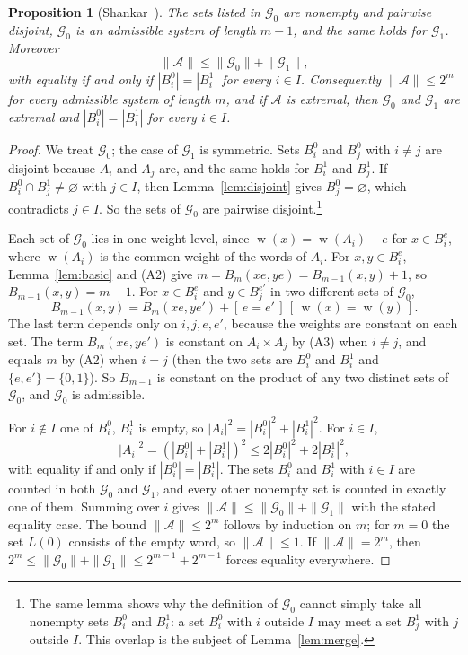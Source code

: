 \documentclass[11pt]{amsart}
\newtheorem{proposition}[theorem]{Proposition}
\theoremstyle{definition}
\theoremstyle{remark}
\numberwithin{equation}{section}
\newcommand{\cA}{\mathcal{A}}
\newcommand{\cG}{\mathcal{G}}
\newcommand{\Iv}[1]{[\,#1\,]}
\DeclareMathOperator{\wt}{w}
\begin{document}
\begin{proposition}[Shankar~{\cite[Lemma~2.3]{Sh}}]\label{prop:inequality}
The sets listed in $\cG_0$ are nonempty and pairwise disjoint, $\cG_0$ is an admissible system of length $m-1$, and the same holds for $\cG_1$. Moreover
\[
\|\cA\|\le\|\cG_0\|+\|\cG_1\| ,
\]
with equality if and only if $|B_i^0|=|B_i^1|$ for every $i\in I$. Consequently $\|\cA\|\le 2^m$ for every admissible system of length $m$, and if $\cA$ is extremal, then $\cG_0$ and $\cG_1$ are extremal and $|B_i^0|=|B_i^1|$ for every $i\in I$.
\end{proposition}

\begin{proof}
We treat $\cG_0$; the case of $\cG_1$ is symmetric. Sets $B_i^0$ and $B_j^0$ with $i\ne j$ are disjoint because $A_i$ and $A_j$ are, and the same holds for $B_i^1$ and $B_j^1$. If $B_i^0\cap B_j^1\ne\varnothing$ with $j\in I$, then Lemma~\ref{lem:disjoint} gives $B_j^0=\varnothing$, which contradicts $j\in I$. So the sets of $\cG_0$ are pairwise disjoint.\footnote{The same lemma shows why the definition of $\cG_0$ cannot simply take all nonempty sets $B_i^0$ and $B_i^1$: a set $B_i^0$ with $i$ outside $I$ may meet a set $B_j^1$ with $j$ outside $I$. This overlap is the subject of Lemma~\ref{lem:merge}.}

Each set of $\cG_0$ lies in one weight level, since $\wt(x)=\wt(A_i)-e$ for $x\in B_i^e$, where $\wt(A_i)$ is the common weight of the words of $A_i$. For $x,y\in B_i^e$, Lemma~\ref{lem:basic} and (A2) give $m=B_m(xe,ye)=B_{m-1}(x,y)+1$, so $B_{m-1}(x,y)=m-1$. For $x\in B_i^e$ and $y\in B_j^{e'}$ in two different sets of $\cG_0$,
\[
B_{m-1}(x,y)=B_m(xe,ye')+\Iv{e=e'}\,\Iv{\wt(x)=\wt(y)} .
\]
The last term depends only on $i,j,e,e'$, because the weights are constant on each set. The term $B_m(xe,ye')$ is constant on $A_i\times A_j$ by (A3) when $i\ne j$, and equals $m$ by (A2) when $i=j$ (then the two sets are $B_i^0$ and $B_i^1$ and $\{e,e'\}=\{0,1\}$). So $B_{m-1}$ is constant on the product of any two distinct sets of $\cG_0$, and $\cG_0$ is admissible.

For $i\notin I$ one of $B_i^0$, $B_i^1$ is empty, so $|A_i|^2=|B_i^0|^2+|B_i^1|^2$. For $i\in I$,
\[
|A_i|^2=(|B_i^0|+|B_i^1|)^2\le 2|B_i^0|^2+2|B_i^1|^2 ,
\]
with equality if and only if $|B_i^0|=|B_i^1|$. The sets $B_i^0$ and $B_i^1$ with $i\in I$ are counted in both $\cG_0$ and $\cG_1$, and every other nonempty set is counted in exactly one of them. Summing over $i$ gives $\|\cA\|\le\|\cG_0\|+\|\cG_1\|$ with the stated equality case. The bound $\|\cA\|\le2^m$ follows by induction on $m$; for $m=0$ the set $L(0)$ consists of the empty word, so $\|\cA\|\le1$. If $\|\cA\|=2^m$, then $2^m\le\|\cG_0\|+\|\cG_1\|\le 2^{m-1}+2^{m-1}$ forces equality everywhere.
\end{proof}
\end{document}
